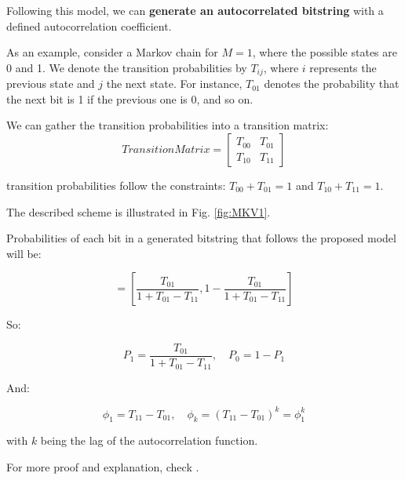 Following this model, we can \textbf{generate an autocorrelated bitstring} with a defined autocorrelation coefficient.  

As an example, consider a Markov chain for \( M=1 \), where the possible states are 0 and 1. We denote the transition probabilities by \( T_{ij} \), where \( i \) represents the previous state and \( j \) the next state. For instance, \( T_{01} \) denotes the probability that the next bit is 1 if the previous one is 0, and so on.  

We can gather the transition probabilities into a transition matrix:  
\begin{equation}
TransitionMatrix = 
\left[\begin{array}{cc}
T_{00} & T_{01} \\
T_{10} & T_{11} 
\end{array}\right]
\end{equation}

\noindentThese transition probabilities follow the constraints: \( T_{00} + T_{01} = 1 \) and \( T_{10} + T_{11} = 1 \).  

\noindent The described scheme is illustrated in Fig. \ref{fig:MKV1}. 

\newline


Probabilities of each bit in a generated bitstring that follows the proposed model will be:

\begin{equation}
[P_0, P_1] = \left[ \frac{T_{01}}{1 + T_{01} - T_{11}}, 1 - \frac{T_{01}}{1 + T_{01} - T_{11}} \right]
\end{equation}

So:

\begin{equation}
P_1 = \frac{T_{01}}{1 + T_{01} - T_{11}}, \quad P_0 = 1 - P_1
\end{equation}

And:

\begin{equation}
\phi_1 = T_{11} - T_{01}, \quad \phi_k = (T_{11} - T_{01})^k = \phi_1^k
\end{equation}

with \( k \) being the lag of the autocorrelation function.

For more proof and explanation, check \cite{dede}.

